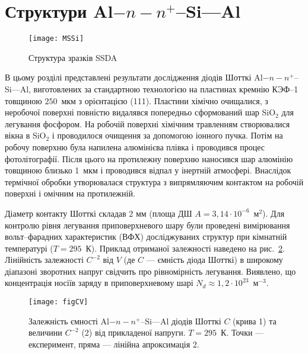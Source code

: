 \section{Структури Al$-n-n^+$--Si---Al\label{MSSi}}

\begin{figure}[b]
\center
\texttt{[image: MSSi]}%
\caption{\label{figMSSi}
Структура зразків SSDA}
\end{figure}



В цьому розділі представлені результати дослідження діодів Шотткі Al$-n-n^+$--Si---Al,
виготовлених за стандартною технологією \cite{Vorobets:FM2003,StrihaBook1987} на пластинах кремнію КЭФ--1 товщиною $250$~мкм
з орієнтацією (111).
Пластини хімічно очищалися, з неробочої поверхні
повністю видалявся попередньо сформований шар SiO$_2$ для легування фосфором.
На робочій поверхні хімічним травленням створювалися вікна в SiO$_2$ і проводилося очищення
за допомогою іонного пучка.
Потім на робочу поверхню була напилена алюмінієва плівка і проводився процес фотолітографії.
Після цього на протилежну поверхню наносився шар алюмінію товщиною близько 1~мкм і проводився відпал
у інертній атмосфері.
Внаслідок термічної обробки утворювалася структура з випрямляючим контактом на робочій поверхні і омічним на протилежній.

Діаметр контакту Шотткі складав 2 мм (площа ДШ $A=3,14\cdot10^{-6}$~м$^2$).
Для контролю рівня легування приповерхневого шару були проведені
вимірювання вольт--фарадних характеристик (ВФХ) досліджуваних структур при кімнатній температурі ($T = 295$~К).
Приклад отриманої залежності наведено на рис.~\ref{figCV}.
Лінійність залежності $C^{-2}$ від $V$
(де $C$ --- ємність діода Шотткі)
в широкому діапазоні зворотних напруг свідчить про рівномірність легування.
Виявлено, що концентрація носіїв заряду в приповерхневому шарі $N_d\approx1,2\cdot10^{23}$~м$^{-3}$.


\begin{figure}
\center
\texttt{[image: figCV]}
\caption{\label{figCV}
Залежність ємності Al$-n-n^+$--Si---Al діодів Шотткі $C$ (крива 1) та величини $C^{-2}$ (2) від прикладеної напруги.
$T=295$~К.
Точки --- експеримент, пряма --- лінійна апроксимація 2.
}%
\end{figure}








